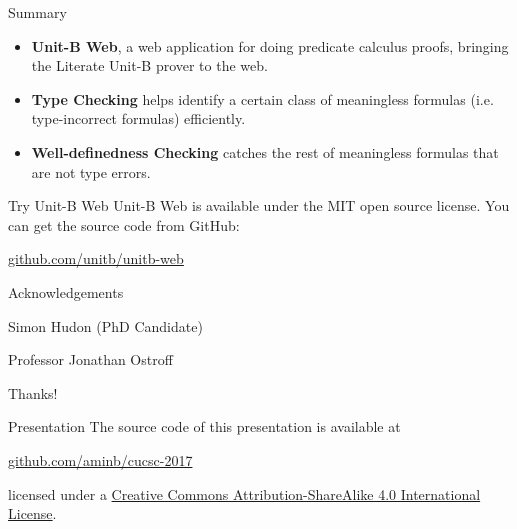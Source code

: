 \documentclass[11pt]{beamer}
\newcommand{\unitb}{Unit-B\xspace}
\begin{document}
\begin{frame}[label=summary]{Summary}

  \begin{itemize}[<+->]
  \item \textbf{\unitb Web}, a web application for doing predicate calculus
    proofs, bringing the Literate \unitb prover to the web.
  \item \textbf{Type Checking} helps identify a certain class of
    meaningless formulas (i.e. type-incorrect formulas) efficiently.
  \item \textbf{Well-definedness Checking} catches the rest of
    meaningless formulas that are not type errors.
  \end{itemize}

\end{frame}

\begin{frame}[fragile]{Try \unitb Web}
  \unitb Web is available under the MIT open source license. You can get the
  source code from GitHub:

  \begin{center}
    \href{https://github.com/unitb/unitb-web}{\url{github.com/unitb/unitb-web}}
  \end{center}
\end{frame}

\begin{frame}{Acknowledgements}
  \large

  Simon Hudon (PhD Candidate)

  Professor Jonathan Ostroff
\end{frame}

\begin{frame}[standout]
  \LARGE Thanks!
\end{frame}


\appendix

\begin{frame}[fragile]{Presentation}
  The source code of this presentation is available at

  \begin{center}
    \href{https://github.com/aminb/cucsc-2017}{\url{github.com/aminb/cucsc-2017}}
  \end{center}

  licensed under a
  \href{http://creativecommons.org/licenses/by-sa/4.0/}{Creative Commons
  Attribution-ShareAlike 4.0 International License}.

  \begin{center}\ccbysa\end{center}
\end{frame}
\end{document}
